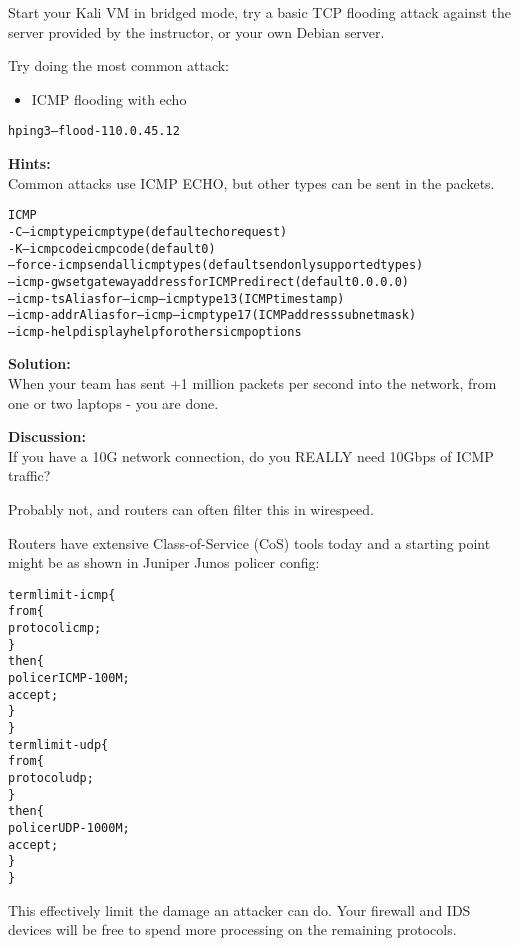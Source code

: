 \documentclass[a4paper,11pt,notitlepage]{report}
\begin{document}
Start your Kali VM in bridged mode, try a basic TCP flooding attack against the server provided by the instructor, or your own Debian server.

Try doing the most common attack:
\begin{itemize}
\item ICMP flooding with echo
\end{itemize}

\begin{alltt}\footnotesize
hping3 --flood -1 10.0.45.12
\end{alltt}





{\bf Hints:}\\
Common attacks use ICMP ECHO, but other types can be sent in the packets.

\begin{alltt}\footnotesize
ICMP
  -C  --icmptype   icmp type (default echo request)
  -K  --icmpcode   icmp code (default 0)
      --force-icmp send all icmp types (default send only supported types)
      --icmp-gw    set gateway address for ICMP redirect (default 0.0.0.0)
      --icmp-ts    Alias for --icmp --icmptype 13 (ICMP timestamp)
      --icmp-addr  Alias for --icmp --icmptype 17 (ICMP address subnet mask)
      --icmp-help  display help for others icmp options
\end{alltt}


{\bf Solution:}\\
When your team has sent +1 million packets per second into the network, from one or two laptops - you are done.

{\bf Discussion:}\\
If you have a 10G network connection, do you REALLY need 10Gbps of ICMP traffic?

Probably not, and routers can often filter this in wirespeed.

Routers have extensive Class-of-Service (CoS) tools today and a starting point might be as shown in Juniper Junos policer config:

\begin{alltt}\footnotesize
term limit-icmp \{
    from \{
        protocol icmp;
    \}
    then \{
        policer ICMP-100M;
        accept;
    \}
\}
term limit-udp \{
    from \{
        protocol udp;
    \}
    then \{
        policer UDP-1000M;
        accept;
    \}
\}
\end{alltt}

This effectively limit the damage an attacker can do. Your firewall and IDS devices will be free to spend more processing on the remaining protocols.
\end{document}
